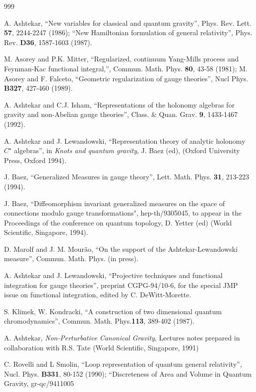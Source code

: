\begin{thebibliography}{999}

 A. Ashtekar, ``New variables for classical and 
quantum gravity'', Phys. Rev. Lett. {\bf 57}, 2244-2247 (1986);
``New Hamiltonian formulation of general relativity'', 
Phys. Rev. {\bf D36}, 1587-1603 (1987).

 M. Asorey and P.K. Mitter, ``Regularized, continuum 
Yang-Mills process and Feynman-Kac functional integral,'', Commun.
Math. Phys. {\bf 80}, 43-58 (1981); M. Asorey and F. Falceto,
``Geometric regularization of gauge theories'', Nucl Phys. {\bf B327},
427-460 (1989).

 A. Ashtekar and C.J. Isham, ``Representations of the 
holonomy algebras for gravity and non-Abelian gauge theories'', 
Class. \& Quan. Grav. {\bf 9}, 1433-1467 (1992).

 A. Ashtekar and J. Lewandowski, ``Representation 
theory of analytic holonomy $C^\star$ algebras'', in {\it Knots and
quantum gravity}, J. Baez (ed), (Oxford University Press, Oxford
1994).

 J. Baez, ``Generalized Measures in gauge theory'', 
Lett. Math. Phys. {\bf 31}, 213-223 (1994).

 J. Baez, ``Diffeomorphism invariant generalized
measures on the space of connections modulo gauge transformations",
hep-th/9305045, to appear in the Proceedings of the conference on
quantum topology, D. Yetter (ed) (World Scientific, Singapore, 1994).

 D. Marolf and J. M. Mour\~ao, ``On the support of the 
Ashtekar-Lewandowski measure'', Commun. Math. Phys. (in press).

 A. Ashtekar and J. Lewandowski, ``Projective techniques 
and functional integration for gauge theories'', preprint
CGPG-94/10-6, for the special JMP issue on functional integration,
edited by C. DeWitt-Morette.

 S. Klimek, W. Kondracki, ``A construction of two dimensional 
quantum chromodynamics'', Commun. Math. Phys.{\bf 113}, 389-402
(1987).

 A. Ashtekar, {\it Non-Perturbative Canonical Gravity},
Lectures notes prepared in collaboration with R.S. Tate (World
Scientific, Singapore, 1991)

 C. Rovelli and L Smolin, ``Loop representation of quantum
general relativity'', Nucl. Phys. {\bf B331}, 80-152 (1990);
``Discreteness of Area and Volume in Quantum Gravity, gr-qc/9411005


\end{thebibliography}
